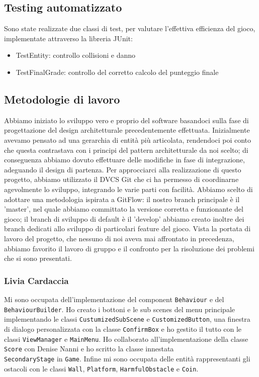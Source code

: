 \documentclass{article}
\begin{document}
\subsection{Testing automatizzato}
Sono state realizzate due classi di test, per valutare l'effettiva efficienza del gioco, implementate attraverso la libreria JUnit:
\begin{itemize}
\item TestEntity: controllo collisioni e danno
\item TestFinalGrade: controllo del corretto calcolo del punteggio finale
\end{itemize}
\subsection{Metodologie di lavoro}
Abbiamo iniziato lo sviluppo vero e proprio del software basandoci sulla fase di progettazione del design architetturale precedentemente effettuata. Inizialmente avevamo pensato ad una gerarchia di entità più articolata, rendendoci poi conto che questa contrastava con i principi del pattern architetturale da noi scelto; di conseguenza abbiamo dovuto effettuare delle modifiche in fase di integrazione, adeguando il design di partenza.
Per approcciarci alla realizzazione di questo progetto, abbiamo utilizzato il DVCS Git che ci ha permesso di coordinarne agevolmente lo sviluppo, integrando le varie parti con facilità. Abbiamo scelto di adottare una metodologia ispirata a GitFlow: il nostro branch principale è il 'master', nel quale abbiamo committato la versione corretta e funzionante del gioco; il branch di sviluppo di default è il 'develop' abbiamo creato inoltre dei branch dedicati allo sviluppo di particolari feature del gioco.
Vista la portata di lavoro del progetto, che nessuno di noi aveva mai affrontato in precedenza, abbiamo favorito il lavoro di gruppo e il confronto per la risoluzione dei problemi che si sono presentati.
\subsubsection{Livia Cardaccia}
Mi sono occupata dell'implementazione del component \texttt{Behaviour} e del \texttt{BehaviourBuilder}.
Ho creato i bottoni e le sub scenes del menu principale implementando le classi \texttt{CustumizedSubScene} e \texttt{CustomizedButton}, una finestra di dialogo personalizzata con la classe \texttt{ConfirmBox} e ho gestito il tutto con le classi \texttt{ViewManager} e \texttt{MainMenu}. Ho collaborato all'implementazione della classe \texttt{Score} con Denise Nanni e ho scritto la classe innestata\\ \texttt{SecondaryStage} in \texttt{Game}. Infine mi sono occupata delle entità rappresentanti gli ostacoli con le classi \texttt{Wall}, \texttt{Platform}, \texttt{HarmfulObstacle} e \texttt{Coin}.
\end{document}

